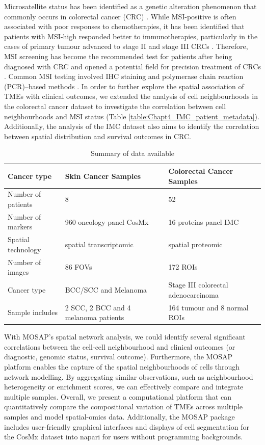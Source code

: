 Microsatellite status has been identified as a genetic alteration phenomenon that commonly occurs in colorectal cancer (CRC) \cite{battaglin2018microsatellite}. While MSI-positive is often associated with poor responses to chemotherapies, it has been identified that patients with MSI-high responded better to immunotherapies, particularly in the cases of primary tumour advanced to stage II and stage III CRCs \cite{battaglin2018microsatellite,kawakami2015microsatellite, li2021quantitative}. Therefore, MSI screening has become the recommended test for patients after being diagnosed with CRC and opened a potential field for precision treatment of CRCs \cite{svrcek2019msi}. Common MSI testing involved IHC staining and polymerase chain reaction (PCR)–based methods \cite{umar2004revised}. In order to further explore the spatial association of TMEs with clinical outcomes, we extended the analysis of cell neighbourhoods in the colorectal cancer dataset to investigate the correlation between cell neighbourhoods and MSI status (Table \ref{table:Chapt4_IMC_patient_metadata}). Additionally, the analysis of the IMC dataset also aims to identify the correlation between spatial distribution and survival outcomes in CRC. 
\begin{table}[ht]
\centering
\caption{Summary of data available}
\begin{tabular}{||P{4cm} || P{5cm} || P{5cm} || } 
 \hline
 Cancer type  & Skin Cancer Samples  & Colorectal Cancer Samples \\ [0.33ex] 
 \hline\hline
 Number of patients & 8 & 52  \\ 
 \hline
 Number of markers & 960 oncology panel CosMx  & 16 proteins panel IMC \\ 
 \hline
 Spatial technology & spatial transcriptomic & spatial proteomic  \\ 
 \hline
 Number of images & 86 FOVs &  172 ROIs \\
 \hline
 Cancer type & BCC/SCC and Melanoma & Stage III colorectal adenocarcinoma \\ [1ex] 
 \hline
 Sample includes  & 2 SCC, 2 BCC and 4 melanoma patients  & 164 tumour and 8 normal ROIs  \\ [1ex] 
 \hline
\end{tabular}
\label{table:Chapt4_DataInfor}
\end{table}
With MOSAP's spatial network analysis, we could identify several significant correlations between the cell-cell neighbourhood and clinical outcomes (or diagnostic, genomic status, survival outcome). Furthermore, the MOSAP platform enables the capture of the spatial neighbourhoods of cells through network modelling. By aggregating similar observations, such as neighbourhood heterogeneity or enrichment scores, we can effectively compare and integrate multiple samples. Overall, we present a computational platform that can quantitatively compare the compositional variation of TMEs across multiple samples and model spatial-omics data. Additionally, the MOSAP package includes user-friendly graphical interfaces and displays of cell segmentation for the CosMx dataset into napari \cite{chiu2022napari} for users without programming backgrounds. 
